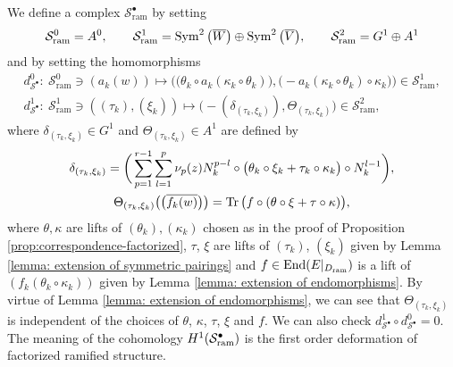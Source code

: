 \documentclass[pdftex]{sigma}
\numberwithin{equation}{section}
\newcommand{\Tr}{\mathop{\rm Tr}\nolimits}
\newcommand\End{\mathop{\rm End}\nolimits}
\newcommand{\Sym}{\mathop{\rm Sym}\nolimits}
\begin{document}
We define a complex
${\mathcal S}^{\bullet}_{\mathrm{ram}}$ by setting
\begin{gather} \label{equation: definition of S^0,S^1,S^2}
 {\mathcal S}^0_{\mathrm{ram}}
 =
 A^0,
 \qquad
 {\mathcal S}^1_{\mathrm{ram}}
 =
 \Sym^2\big(\overline{W}\big) \oplus \Sym^2\big(\overline{V}\big),
\qquad
 {\mathcal S}^2_{\mathrm{ram}}
 =
 G^1\oplus A^1
\end{gather}
and by setting the homomorphisms
\begin{gather}
 d_{{\mathcal S}^{\bullet}}^0\colon \
 {\mathcal S}^0_{\mathrm{ram}} \ni (a_k(w)) \mapsto
\big( \big( \theta_k\circ a_k(\kappa_k\circ\theta_k) \big) ,
 \big( {-}a_k(\kappa_k\circ\theta_k)\circ\kappa_k \big) \big)
 \in {\mathcal S}^1_{\mathrm{ram}},\nonumber \\
 d_{{\mathcal S}^{\bullet}}^1\colon \
 {\mathcal S}^1_{\mathrm{ram}}
 \ni ( (\tau_k), (\xi_k))
 \mapsto
\big( {-}(\delta_{(\tau_k,\xi_k)}) , \Theta_{(\tau_k,\xi_k)} \big)
 \in {\mathcal S}^2_{\mathrm{ram}},\label{equation: definition of complex S^dot}
\end{gather}
where $\delta_{(\tau_k,\xi_k)}\in G^1$
and $\Theta_{(\tau_k,\xi_k)}\in A^1$
are defined by
\begin{gather*}
 \delta_{(\tau_k,\xi_k)}
 =
 \bigg( \sum_{p=1}^{r-1}\sum_{l=1}^p \nu_p(z)
 N_k^{p-l} \circ\big(\theta_k\circ\xi_k+\tau_k\circ\kappa_k \big) \circ N_k^{l-1} \bigg),
 \\
 \Theta_{(\tau_k,\xi_k)} \big( \big(\overline{f_k(w)} \big) \big)
 =
 \Tr \big( f\circ (\theta\circ\xi+\tau\circ\kappa) \big),
\end{gather*}
where $\theta,\kappa$ are lifts of $(\theta_k),(\kappa_k)$
chosen as in the proof of Proposition \ref{prop:correspondence-factorized},
$\tau$, $\xi$ are lifts of $(\tau_k)$, $(\xi_k)$
given by Lemma \ref{lemma: extension of symmetric pairings}
and $f\in \End(E|_{D_{\mathrm{ram}}})$ is a lift of $(f_k(\theta_k\circ\kappa_k))$
given by Lemma \ref{lemma: extension of endomorphisms}.
By virtue of Lemma \ref{lemma: extension of endomorphisms},
we can see that $\Theta_{(\tau_k,\xi_k)}$ is independent of the choices of
$\theta$, $\kappa$, $\tau$, $\xi$ and $f$.
We can also check $d^1_{{\mathcal S}^{\bullet}}\circ d^0_{{\mathcal S}^{\bullet}}=0$.
The meaning of the cohomology
$H^1({\mathcal S}^{\bullet}_{\rm ram})$
is the first order deformation of factorized ramified structure.
\end{document}
